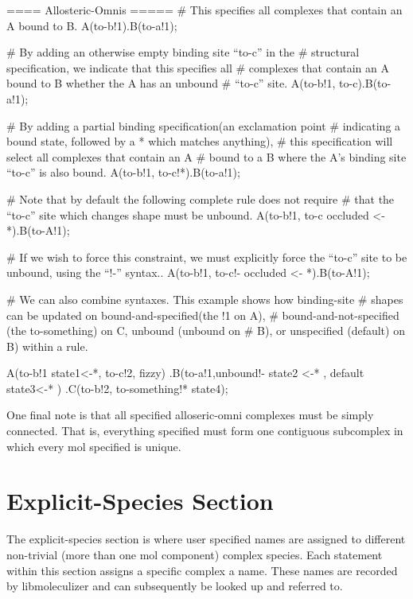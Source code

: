 \begin{ExampleMZR}
==== Allosteric-Omnis =====
  # This specifies all complexes that contain an A bound to B.
  A(to-b!1).B(to-a!1);

  # By adding an otherwise empty binding site ``to-c'' in the
  # structural specification, we indicate that this specifies all
  # complexes that contain an A bound to B whether the A has an unbound
  # ``to-c'' site.
  A(to-b!1, to-c).B(to-a!1);


  # By adding a partial binding specification(an exclamation point
  # indicating a bound state, followed by a * which matches anything),
  # this specification will select all complexes that contain an A
  # bound to a B where the A's binding site ``to-c'' is also bound.
  A(to-b!1, to-c!*).B(to-a!1);

  # Note that by default the following complete rule does not require
  # that the ``to-c'' site which changes shape must be unbound.  
  A(to-b!1, to-c {occluded <- *}).B(to-A!1);

  # If we wish to force this constraint, we must explicitly force the
  ``to-c'' site to be unbound, using the ``!-'' syntax..
  A(to-b!1, to-c!- {occluded <- *}).B(to-A!1);

  # We can also combine syntaxes.  This example shows how binding-site
  # shapes can be updated on bound-and-specified(the !1 on A),
  # bound-and-not-specified (the to-something) on C, unbound (unbound on
  # B), or unspecified (default) on B) within a rule.

  A(to-b!1 {state1<-*}, to-c!2, fizzy) 
  .B(to-a!1,unbound!- {state2 <-* }, default {state3<-*} ) 
  .C(to-b!2, to-something!* {state4});

\end{ExampleMZR}

One final note is that all specified alloseric-omni complexes must be
simply connected.  That is, everything specified must form one contiguous
subcomplex in which every mol specified is unique.


\section{Explicit-Species Section}
The explicit-species section is where user specified names are
assigned to different non-trivial (more than one mol component)
complex species.  Each statement within this section assigns a
specific complex a name.  These names are recorded by libmoleculizer
and can subsequently be looked up and referred to.


